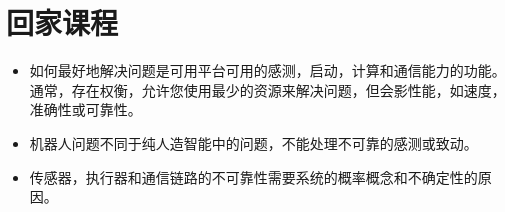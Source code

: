 \section*{回家课程}

\begin{itemize}
\item 如何最好地解决问题是可用平台可用的感测，启动，计算和通信能力的功能。通常，存在权衡，允许您使用最少的资源来解决问题，但会影性能，如速度，准确性或可靠性。
\item 机器人问题不同于纯人造智能中的问题，不能处理不可靠的感测或致动。
\item 传感器，执行器和通信链路的不可靠性需要系统的概率概念和不确定性的原因。
\end{itemize}


